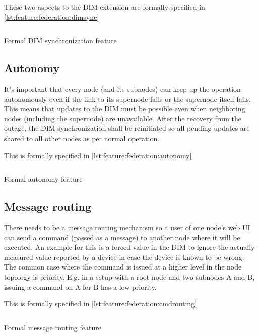 These two aspects to the DIM extension are formally specified in \autoref{lst:feature:federation:dimsync}

\begin{listing}
	\inputminted{Gherkin}{listings/features/federation/dim_extension.feature}
	\caption{Formal DIM synchronization feature}
	\label{lst:feature:federation:dimsync}
\end{listing}

\subsection{Autonomy}
It's important that every node (and its subnodes) can keep up the operation autonomously even if the
link to its supernode fails or the supernode itself fails. This means that updates to
the \gls{DIM} must be possible even when neighboring nodes (including the supernode) are unavailable. After the
recovery from the outage, the \gls{DIM} synchronization shall be reinitiated so
all pending updates are shared to all other nodes as per normal operation.

This is formally specified in \autoref{lst:feature:federation:autonomy}

\begin{listing}
	\inputminted{Gherkin}{listings/features/federation/autonomy.feature}
	\caption{Formal autonomy feature}
	\label{lst:feature:federation:autonomy}
\end{listing}

\subsection{Message routing}
There needs to be a message routing mechanism so a user
of one node's web UI can send a command (passed as a message) to another node where it will be
executed. An example for this is a forced value in the DIM to ignore the
actually measured value reported by a device in case the device is known to be
wrong. The common case where the command is issued at a higher level in the node
topology is priority. E.g. in a setup with a root node and two
subnodes A and B, issuing a command on A for B has a low priority.

This is formally specified in \autoref{lst:feature:federation:cmdrouting}

\begin{listing}
	\inputminted{Gherkin}{listings/features/federation/message_routing.feature}
	\caption{Formal message routing feature}
	\label{lst:feature:federation:cmdrouting}
\end{listing}

